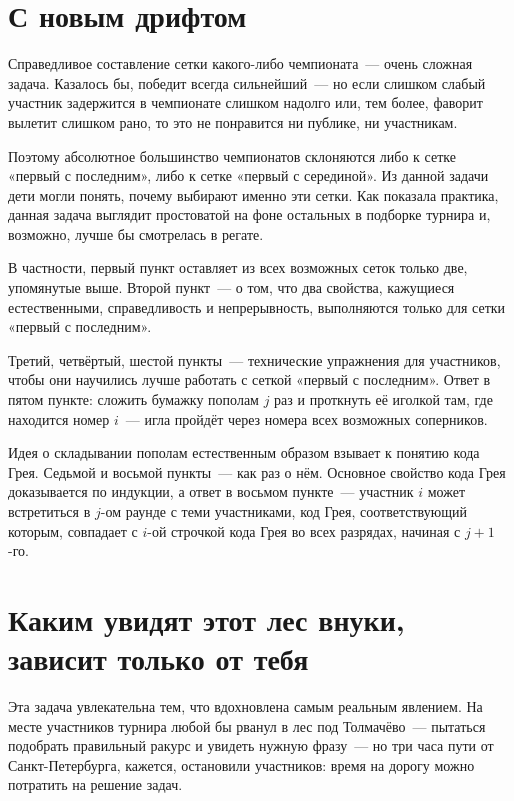 \documentclass[a4paper,11pt]{article}
\begin{document}
\section{С новым дрифтом}

Справедливое составление сетки какого-либо чемпионата~— очень сложная задача. Казалось бы, победит всегда сильнейший~— но если слишком слабый участник задержится в чемпионате слишком надолго или, тем более, фаворит вылетит слишком рано, то это не понравится ни публике, ни участникам.

Поэтому абсолютное большинство чемпионатов склоняются либо к сетке «первый с последним», либо к сетке «первый с серединой». Из данной задачи дети могли понять, почему выбирают именно эти сетки. Как показала практика, данная задача выглядит простоватой на фоне остальных в подборке турнира и, возможно, лучше бы смотрелась в регате.

В частности, первый пункт оставляет из всех возможных сеток только две, упомянутые выше. Второй пункт~— о том, что два свойства, кажущиеся естественными, справедливость и непрерывность, выполняются только для сетки «первый с последним».

Третий, четвёртый, шестой пункты~— технические упражнения для участников, чтобы они научились лучше работать с сеткой «первый с последним». Ответ в пятом пункте: сложить бумажку пополам \( j \) раз и проткнуть её иголкой там, где находится номер \( i \)~— игла пройдёт через номера всех возможных соперников.

Идея о складывании пополам естественным образом взывает к понятию кода Грея. Седьмой и восьмой пункты~— как раз о нём. Основное свойство кода Грея доказывается по индукции, а ответ в восьмом пункте~— участник \( i \) может встретиться в \( j \)-ом раунде с теми участниками, код Грея, соответствующий которым, совпадает с \( i \)-ой строчкой кода Грея во всех разрядах, начиная с \( j+1 \)-го.

\section{Каким увидят этот лес внуки, зависит только от тебя}

\newcommand{\deredivline}[5]{
	\draw (#1,#2) --
		++(#5 * #1 cm - #5 * #3 cm, #5 * #2 cm - #5 * #4 cm);
	\draw (#3,#4) --
		++(#5 * #3 cm - #5 * #1 cm, #5 * #4 cm - #5 * #2 cm);
}

Эта задача увлекательна тем, что вдохновлена самым реальным явлением. На месте участников турнира любой бы рванул в лес под Толмачёво~— пытаться подобрать правильный ракурс и увидеть нужную фразу~— но три часа пути от Санкт-Петербурга, кажется, остановили участников: время на дорогу можно потратить на решение задач.
\end{document}
